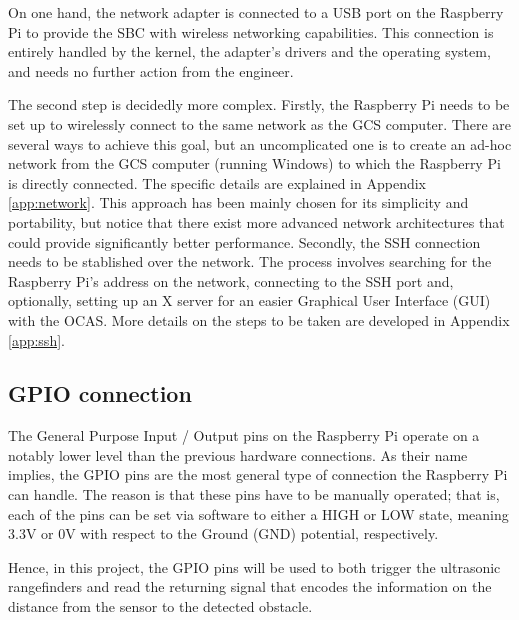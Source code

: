 On one hand, the network adapter is connected to a USB port on the Raspberry Pi to provide the SBC with wireless networking capabilities.
This connection is entirely handled by the kernel, the adapter's drivers and the operating system, and needs no further action from the engineer.

The second step is decidedly more complex.
Firstly, the Raspberry Pi needs to be set up to wirelessly connect to the same network as the GCS computer.
There are several ways to achieve this goal, but an uncomplicated one is to create an ad-hoc network from the GCS computer (running Windows) to which the Raspberry Pi is directly connected.
The specific details are explained in Appendix \ref{app:network}.
This approach has been mainly chosen for its simplicity and portability, but notice that there exist more advanced network architectures that could provide significantly better performance.
Secondly, the SSH connection needs to be stablished over the network.
The process involves searching for the Raspberry Pi's address on the network, connecting to the SSH port and, optionally, setting up an X server for an easier Graphical User Interface (GUI) with the OCAS.
More details on the steps to be taken are developed in Appendix \ref{app:ssh}.

\subsection{GPIO connection}

The General Purpose Input / Output pins on the Raspberry Pi operate on a notably lower level than the previous hardware connections.
As their name implies, the GPIO pins are the most general type of connection the Raspberry Pi can handle.
The reason is that these pins have to be manually operated; that is, each of the pins can be set via software to either a HIGH or LOW state, meaning 3.3V or 0V with respect to the Ground (GND) potential, respectively.

Hence, in this project, the GPIO pins will be used to both trigger the ultrasonic rangefinders and read the returning signal that encodes the information on the distance from the sensor to the detected obstacle.


